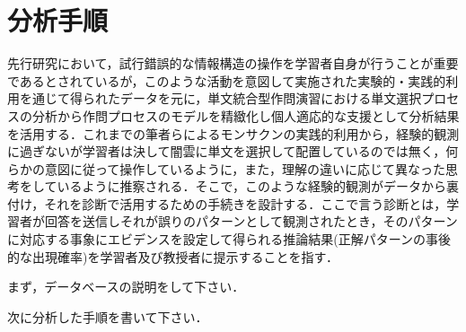 \section{分析手順}

先行研究において，試行錯誤的な情報構造の操作を学習者自身が行うことが重要であるとされているが，このような活動を意図して実施された実験的・実践的利用を通じて得られたデータを元に，単文統合型作問演習における単文選択プロセスの分析から作問プロセスのモデルを精緻化し個人適応的な支援として分析結果を活用する．これまでの筆者らによるモンサクンの実践的利用から，経験的観測に過ぎないが学習者は決して闇雲に単文を選択して配置しているのでは無く，何らかの意図に従って操作しているように，また，理解の違いに応じて異なった思考をしているように推察される．そこで，このような経験的観測がデータから裏付け，それを診断で活用するための手続きを設計する．ここで言う診断とは，学習者が回答を送信しそれが誤りのパターンとして観測されたとき，そのパターンに対応する事象にエビデンスを設定して得られる推論結果(正解パターンの事後的な出現確率)を学習者及び教授者に提示することを指す．

まず，データベースの説明をして下さい．

次に分析した手順を書いて下さい．